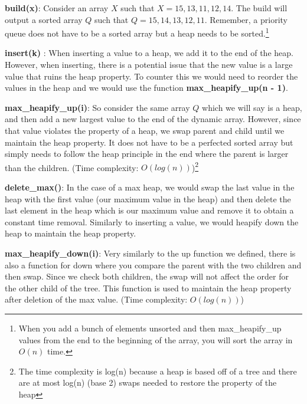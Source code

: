 \documentclass[11pt,a4paper,english]{report}
\begin{document}
\begin{itemize} {

    \item \textbf{build(x)}: Consider an array $X$ such that $X = {15, 13, 11, 12, 14}$. The build will output a sorted array $Q$ such that $Q = {15, 14, 13, 12, 11}$. Remember, a priority queue does not have to be a sorted array but a heap needs to be sorted.\footnote{When you add a bunch of elements unsorted and then max\_heapify\_up values from the end to the beginning of the array, you will sort the array in $O(n)$ time.}

    \item \textbf{insert(k)} : When inserting a value to a heap, we add it to the end of the heap. However, when inserting, there is a potential issue that the new value is a large value that ruins the heap property. To counter this we would need to reorder the values in the heap and we would use the function \textbf{max\_heapify\_up(n - 1)}.


    \item \textbf{max\_heapify\_up(i)}: So consider the same array $Q$ which we will say is a heap, and then add a new largest value to the end of the dynamic array. However, since that value violates the property of a heap, we swap parent and child until we maintain the heap property. It does not have to be a perfected sorted array but simply needs to follow the heap principle in the end where the parent is larger than the children. (Time complexity: $O(log(n))$)\footnote{The time complexity is log(n) because a heap is based off of a tree and there are at most log(n) (base 2) swaps needed to restore the property of the heap}

    \item \textbf{delete\_max()}: In the case of a max heap, we would swap the last value in the heap with the first value (our maximum value in the heap) and then delete the last element in the heap which is our maximum value and remove it to obtain a constant time removal. Similarly to inserting a value, we would heapify down the heap to maintain the heap property.

    \item \textbf{max\_heapify\_down(i)}: Very similarly to the up function we defined, there is also a function for down where you compare the parent with the two children and then swap. Since we check both children, the swap will not affect the order for the other child of the tree. This function is used to maintain the heap property after deletion of the max value. (Time complexity: $O(log(n))$)

}\end{itemize}
\end{document}
